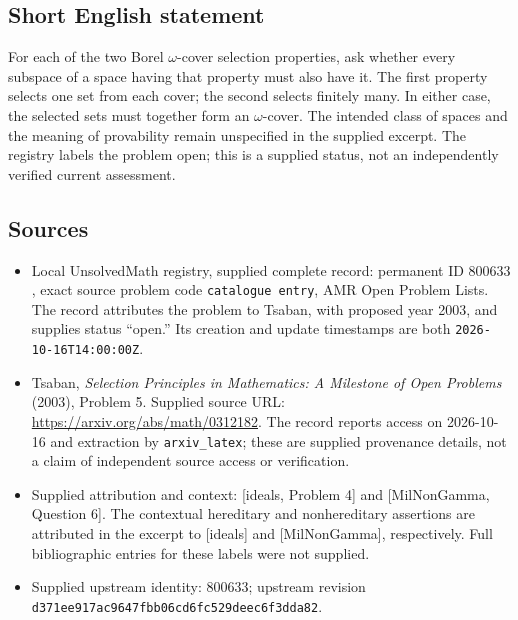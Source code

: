 \documentclass[11pt]{article}
\begin{document}
\subsection{Short English statement}
For each of the two Borel \(\omega\)-cover selection properties, ask whether every subspace of a space having that property must also have it. The first property selects one set from each cover; the second selects finitely many. In either case, the selected sets must together form an \(\omega\)-cover. The intended class of spaces and the meaning of provability remain unspecified in the supplied excerpt. The registry labels the problem open; this is a supplied status, not an independently verified current assessment.
\subsection{Sources}
\begin{itemize}
\item Local UnsolvedMath registry, supplied complete record: permanent ID \(800633\), exact source problem code \texttt{catalogue entry}, AMR Open Problem Lists. The record attributes the problem to Tsaban, with proposed year 2003, and supplies status ``open.'' Its creation and update timestamps are both \texttt{2026-10-16T14:00:00Z}.
\item Tsaban, \emph{Selection Principles in Mathematics: A Milestone of Open Problems} (2003), Problem 5. Supplied source URL: \url{https://arxiv.org/abs/math/0312182}. The record reports access on 2026-10-16 and extraction by \texttt{arxiv\_latex}; these are supplied provenance details, not a claim of independent source access or verification.
\item Supplied attribution and context: [ideals, Problem 4] and [MilNonGamma, Question 6]. The contextual hereditary and nonhereditary assertions are attributed in the excerpt to [ideals] and [MilNonGamma], respectively. Full bibliographic entries for these labels were not supplied.
\item Supplied upstream identity: \(800633\); upstream revision \texttt{d371ee917ac9647fbb06cd6fc529deec6f3dda82}.
\end{itemize}
\end{document}
